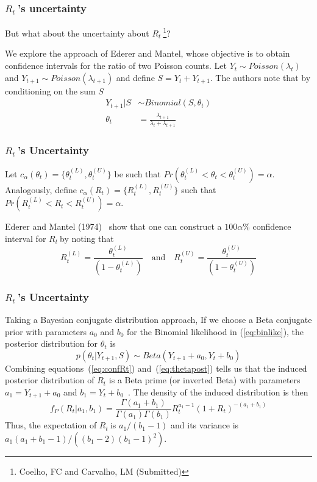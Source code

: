 \documentclass[10pt,compress,notheorems]{beamer}
\def \rr {$R_{t}\:$}
\begin{document}
\begin{frame}
\frametitle{\rr's uncertainty}
But what about the uncertainty about \rr\footnote{Coelho, FC and Carvalho, LM 
(Submitted)}?

We explore the approach of Ederer and Mantel\cite{mantel}, whose objective is 
to obtain 
confidence intervals for the ratio of two Poisson counts. 
Let $Y_{t} \sim Poisson(\lambda_t)$ and $Y_{t+1} \sim Poisson(\lambda_{t+1})$ 
and define $S = Y_{t} + Y_{t+1}$.
The authors note that by conditioning on the sum $S$
\begin{align}
\label{eq:binlike}
Y_{t+1} | S &\sim Binomial(S, \theta_t) \\
\theta_t &= \frac{\lambda_{t+1}}{\lambda_{t} + \lambda_{t+1}}
\end{align}
\end{frame}

\begin{frame}
\frametitle{\rr's Uncertainty}
Let $c_{\alpha}(\theta_t) = \{\theta_t^{(L)} , \theta_t^{(U)} \}$ be such that 
$Pr(\theta_t^{(L)}<\theta_t <\theta_t^{(U)}) = \alpha$.
Analogously, define $c_{\alpha}(R_t) = \{R_t^{(L)} , R_t^{(U)} \}$ such that 
$Pr(R_t^{(L)}<R_t<R_t^{(U)}) = \alpha$.

Ederer and Mantel (1974)~\cite{mantel} show that one can construct a $100\alpha 
\%$ confidence interval for \rr by noting that
\begin{equation}
\label{eq:confRt}
 R_t^{(L)} = \frac{\theta_t^{(L)}}{(1-\theta_t^{(L)})} \quad \text{and} \quad 
R_t^{(U)} = \frac{\theta_t^{(U)}}{(1-\theta_t^{(U)})}
\end{equation}
\end{frame}

\begin{frame}
\frametitle{\rr's Uncertainty}
Taking a Bayesian conjugate distribution approach, If we choose a
Beta conjugate prior with parameters $a_0$ and $b_0$ for the 
Binomial likelihood in (\ref{eq:binlike}), the posterior distribution for 
$\theta_t$ is
\begin{equation}
\label{eq:thetapost}
p(\theta_t| Y_{t+1}, S) \sim Beta(Y_{t+1} + a_0, Y_t + b_0)
\end{equation}
Combining equations~(\ref{eq:confRt}) and~(\ref{eq:thetapost}) 
tells us that the induced posterior distribution of $R_t$ is 
a Beta prime (or inverted Beta) with parameters $ a_1 = Y_{t+1} + a_0$ and $b_1 
=  Y_t + b_0$~\cite{dubey1970}.
The density of the induced distribution is then 
\begin{equation}
\label{eq:densityMantel}
f_P(R_t| a_1, b_1) = \frac{\Gamma(a_1 + b_1)}{\Gamma(a_1)\Gamma(b_1)} R_t^{a_1 
- 
1} (1 + R_t)^{-(a_1 + b_1)}
\end{equation}
Thus, the expectation of \rr is $a_1/(b_1 - 1)$ and its variance is 
$a_1(a_1 + b_1 - 1)/\left((b_1 - 2)(b_1 - 1)^2 \right) $.
\end{frame}
\end{document}
